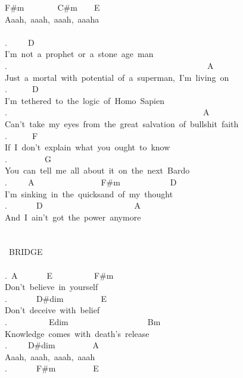 {F\#m\ \ \ \ \ \ \ \ C\#m\ \ \ \ E\\
Aaah,\ aaah,\ aaah,\ aaaha\\
\\
.\ \ \ \ \ D\ \ \ \ \ \ \ \ \ \ \ \ \ \ \ \ \ \ \ \ \\
I'm\ not\ a\ prophet\ or\ a\ stone\ age\ man\\
.\ \ \ \ \ \ \ \ \ \ \ \ \ \ \ \ \ \ \ \ \ \ \ \ \ \ \ \ \ \ \ \ \ \ \ \ \ \ \ \ \ \ \ \ \ \ \ \ A\ \\
Just\ a\ mortal\ with\ potential\ of\ a\ superman,\ I'm\ living\ on\\
.\ \ \ \ \ \ D\ \ \ \ \ \ \ \ \ \ \ \ \ \\
I'm\ tethered\ to\ the\ logic\ of\ Homo\ Sapien\\
.\ \ \ \ \ \ \ \ \ \ \ \ \ \ \ \ \ \ \ \ \ \ \ \ \ \ \ \ \ \ \ \ \ \ \ \ \ \ \ \ \ \ \ \ \ \ \ A\\
Can't\ take\ my\ eyes\ from\ the\ great\ salvation\ of\ bullshit\ faith\\
.\ \ \ \ \ \ F\\
If\ I\ don't\ explain\ what\ you\ ought\ to\ know\\
.\ \ \ \ \ \ \ \ \ G\\
You\ can\ tell\ me\ all\ about\ it\ on\ the\ next\ Bardo\\
.\ \ \ \ \ A\ \ \ \ \ \ \ \ \ \ \ \ \ \ \ \ F\#m\ \ \ \ \ \ \ \ \ \ \ \ D\\
I'm\ sinking\ in\ the\ quicksand\ of\ my\ thought\\
.\ \ \ \ \ \ \ D\ \ \ \ \ \ \ \ \ \ \ \ \ \ \ \ \ \ \ \ \ \ A\\
And\ I\ ain't\ got\ the\ power\ anymore\\
\\
\\
\lbrack\ BRIDGE\rbrack\\
\\
.\ A\ \ \ \ \ \ \ E\ \ \ \ \ \ \ \ \ \ F\#m\\
Don't\ believe\ in\ yourself\\
.\ \ \ \ \ \ \ D\#dim\ \ \ \ \ \ \ \ \ E\\
Don't\ deceive\ with\ belief\\
.\ \ \ \ \ \ \ \ \ \ Edim\ \ \ \ \ \ \ \ \ \ \ \ \ \ \ \ \ \ \ Bm\\
Knowledge\ comes\ with\ death's\ release\\
.\ \ \ \ \ D\#dim\ \ \ \ \ \ \ \ \ A\\
Aaah,\ aaah,\ aaah,\ aaah\\
.\ \ \ \ \ \ \ F\#m\ \ \ \ \ \ \ \ \ E\\
}
